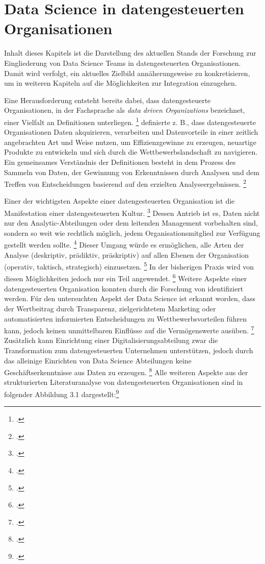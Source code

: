 \chapter{Data Science in datengesteuerten Organisationen}

Inhalt dieses Kapitels ist die Darstellung des aktuellen Stands der Forschung zur Eingliederung von Data Science Teams in datengesteuerten Organisationen.
Damit wird verfolgt, ein aktuelles Zielbild annäherungsweise zu konkretisieren, um in weiteren Kapiteln auf die Möglichkeiten zur Integration einzugehen.

Eine Herausforderung entsteht bereits dabei, dass datengesteuerte Organisationen, in der Fachsprache als \textit{data driven Organizations} bezeichnet, einer Vielfalt an Definitionen unterliegen. \footcite[Vgl.][S. 4]{Dalpiaz.2020}
 definierte z. B., dass datengesteuerte Organisationen Daten akquirieren, verarbeiten und Datenvorteile in einer zeitlich angebrachten Art und Weise nutzen, um Effizienzgewinne zu erzeugen, neuartige Produkte zu entwickeln und sich durch die Wettbewerbslandschaft zu navigieren. %
Ein gemeinsames Verständnis der Definitionen besteht in dem Prozess des Sammeln von Daten, der Gewinnung von Erkenntnissen durch Analysen und dem Treffen von Entscheidungen basierend auf den erzielten Analyseergebnissen. \footcite[Vgl.][S. 4]{Dalpiaz.2020}

Einer der wichtigsten Aspekte einer datengesteuerten Organisation ist die Manifestation einer datengesteuerten Kultur. \footcite[Vgl.][S. 15]{Dalpiaz.2020}
Dessen Antrieb ist es, Daten nicht nur den Analytic-Abteilungen oder dem leitenden Management vorbehalten sind, sondern so weit wie rechtlich möglich, jedem Organisationsmitglied zur Verfügung gestellt werden sollte. \footcite[Vgl.][S. 6]{Patil.2011}
Dieser Umgang würde es ermöglichen, alle Arten der Analyse (deskriptiv, prädiktiv, präskriptiv) auf allen Ebenen der Organisation (operativ, taktisch, strategisch) einzusetzen. \footcite[Vgl.][S. 4]{Dalpiaz.2020}
In der bisherigen Praxis wird von diesen Möglichkeiten jedoch nur ein Teil angewendet. \footcite[Vgl.][S. 4]{Dalpiaz.2020}
Weitere Aspekte einer datengesteuerten Organisation konnten durch die Forschung von  identifiziert werden.
Für den untersuchten Aspekt der Data Science ist erkannt worden, dass der Wertbeitrag durch Transparenz, zielgerichtetem Marketing oder automatisierten informierten Entscheidungen zu Wettbewerbsvorteilen führen kann, jedoch keinen unmittelbaren Einflüsse auf die Vermögenswerte ausüben. \footcite[Vgl.][S. 5]{MariusHupperz.2021}
Zusätzlich kann Einrichtung einer Digitalisierungsabteilung zwar die Transformation zum datengesteuerten Unternehmen unterstützen, jedoch durch das alleinige Einrichten von Data Science Abteilungen keine Geschäftserkenntnisse aus Daten zu erzeugen. \footcite[Vgl.][S. 5]{MariusHupperz.2021}
Alle weiteren Aspekte aus der strukturierten Literaturanalyse von datengesteuerten Organisationen sind in folgender Abbildung 3.1 dargestellt:\footcite[Vgl.][S. 4]{MariusHupperz.2021}

